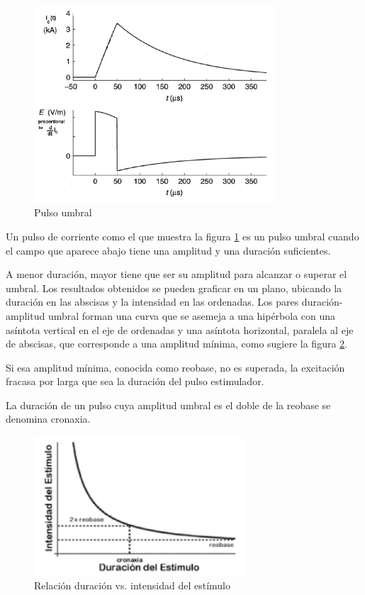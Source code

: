 \begin{figure}[H]
    \centering
    \includegraphics[width=0.8\textwidth]{./Figures/fig613}
	\caption{Pulso umbral}
	\label{fig:613}
\end{figure}

Un pulso de corriente como el que muestra la figura \ref{fig:613} es un pulso umbral cuando el campo que aparece abajo tiene una amplitud y una duración suficientes.

A menor duración, mayor tiene que ser su amplitud para alcanzar o superar el umbral.
Los resultados obtenidos se pueden graficar en un plano, ubicando la duración en las abscisas y la intensidad en las ordenadas.
Los pares duración-amplitud umbral forman una curva que se asemeja a una hipérbola con una asíntota vertical en el eje de ordenadas y una asíntota horizontal, paralela al eje de abscisas, que corresponde a una amplitud mínima, como sugiere la figura \ref{fig:614}.

Si esa amplitud mínima, conocida como reobase, no es superada, la excitación fracasa por larga que sea la duración del pulso estimulador.

La duración de un pulso cuya amplitud umbral es el doble de la reobase se denomina cronaxia.

\begin{figure}[H]
    \centering
    \includegraphics[width=0.7\textwidth]{./Figures/fig614}
	\caption{Relación duración vs. intensidad del estímulo}
	\label{fig:614}
\end{figure}

